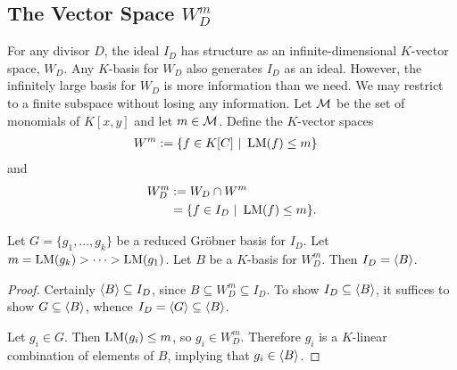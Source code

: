 
\subsection{The Vector Space $W_D^m$}

For any divisor $D$, the ideal $I_D$ has structure as an infinite-dimensional $K$-vector space, $W_D$.
Any $K$-basis for $W_D$ also generates $I_D$ as an ideal.
However, the infinitely large basis for $W_D$ is more information than we need.
We may restrict to a finite subspace without losing any information.
Let $\cal M$ be the set of monomials of $K[x,y]$ and let $m \in \cal M$.
Define the $K$-vector spaces
\begin{align*}
  W^m &:= \{ f \in K[C] ~|~ \LM(f) \leq m \}
\end{align*}
and
\begin{align*}
  W_D^m &:= W_D \cap W^m \\
        &= \{ f \in I_D ~|~ \LM(f) \leq m \}.
\end{align*}
\begin{comment}
\begin{remark}
  Since $-\nu_{P_\infty}(x^4) = -\nu_{P_\infty}(y^3)$, $W^{x^4} = W^{y^3}$.
  In practice, it is easier to assume $m$ is not divisible by $y^3$ and think of $W^m$ as the space
  \[ W^m = \{ f \in K[x,y] ~|~ \LM(f) \leq m, ~\text{$f$ is reduced modulo $y^3$} \}. \]
\end{remark}
\end{comment}
\begin{proposition}
  \label{prop_vector_space_basis_generates_I}
  Let $G = \{g_1, \ldots, g_k\}$ be a reduced Gr\"obner basis for $I_D$.
  Let $m = \LM(g_k) > \dots > \LM(g_1)$.
  Let $B$ be a $K$-basis for $W_D^m$.
  Then $I_D = \pid B$.
\end{proposition}
\begin{proof}
  Certainly $\pid B \subseteq I_D$, since $B \subseteq W_D^m \subseteq I_D$.
  To show $I_D \subseteq \pid B$, it suffices to show $G \subseteq \pid B$, whence $I_D = \pid G \subseteq \pid B$.
  
  Let $g_i \in G$.
  Then $\LM(g_i) \leq m$, so $g_i \in W_D^m$.
  Therefore $g_i$ is a $K$-linear combination of elements of $B$,
  implying that $g_i \in \pid B$.
\end{proof}

